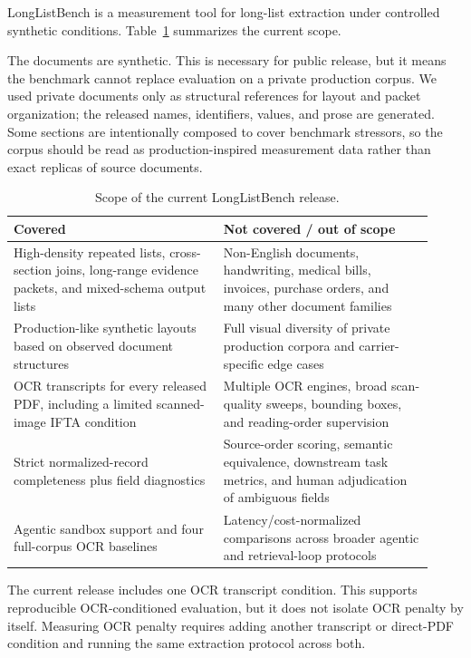 LongListBench is a measurement tool for long-list extraction under controlled synthetic conditions. Table~\ref{tab:benchmark-scope} summarizes the current scope.

The documents are synthetic. This is necessary for public release, but it means the benchmark cannot replace evaluation on a private production corpus. We used private documents only as structural references for layout and packet organization; the released names, identifiers, values, and prose are generated. Some sections are intentionally composed to cover benchmark stressors, so the corpus should be read as production-inspired measurement data rather than exact replicas of source documents.

\begin{table}[H]
\centering
\caption{Scope of the current LongListBench release.}
\label{tab:benchmark-scope}
\begin{tabular}{>{\raggedright\arraybackslash}p{0.46\linewidth} >{\raggedright\arraybackslash}p{0.46\linewidth}}
\toprule
Covered & Not covered / out of scope \\
\midrule
High-density repeated lists, cross-section joins, long-range evidence packets, and mixed-schema output lists & Non-English documents, handwriting, medical bills, invoices, purchase orders, and many other document families \\
Production-like synthetic layouts based on observed document structures & Full visual diversity of private production corpora and carrier-specific edge cases \\
OCR transcripts for every released PDF, including a limited scanned-image IFTA condition & Multiple OCR engines, broad scan-quality sweeps, bounding boxes, and reading-order supervision \\
Strict normalized-record completeness plus field diagnostics & Source-order scoring, semantic equivalence, downstream task metrics, and human adjudication of ambiguous fields \\
Agentic sandbox support and four full-corpus OCR baselines & Latency/cost-normalized comparisons across broader agentic and retrieval-loop protocols \\
\bottomrule
\end{tabular}
\end{table}

The current release includes one OCR transcript condition. This supports reproducible OCR-conditioned evaluation, but it does not isolate OCR penalty by itself. Measuring OCR penalty requires adding another transcript or direct-PDF condition and running the same extraction protocol across both.

